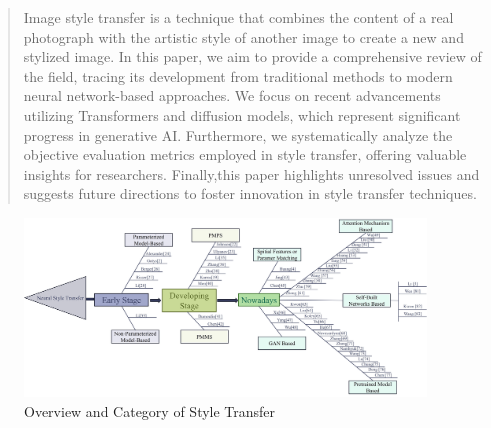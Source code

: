 \documentclass[preprint,12pt]{elsarticle}
\begin{document}
\begin{frontmatter}
\author{Junming Yang} %


\begin{abstract}
Image style transfer is a technique that combines the content of a real photograph with the artistic style of another image to create a new and stylized image. In this paper, we aim to provide a comprehensive review of the field, tracing its development from traditional methods to modern neural network-based approaches. We focus on recent advancements utilizing Transformers and diffusion models, which represent significant progress in generative AI. Furthermore, we systematically analyze the objective evaluation metrics employed in style transfer, offering valuable insights for researchers. Finally,this paper highlights unresolved issues and suggests future directions to foster innovation in style transfer techniques.
\end{abstract}

\begin{graphicalabstract}
  \begin{figure}[t]%
    \centering%
    \includegraphics[width=0.95\textwidth]{Figure_1_Overview_and_Category_of_Style_Transfer.jpg}
    \caption{Overview and Category of Style Transfer}\label{fig1}
    \end{figure}
  \end{graphicalabstract}


\end{frontmatter}
\end{document}
